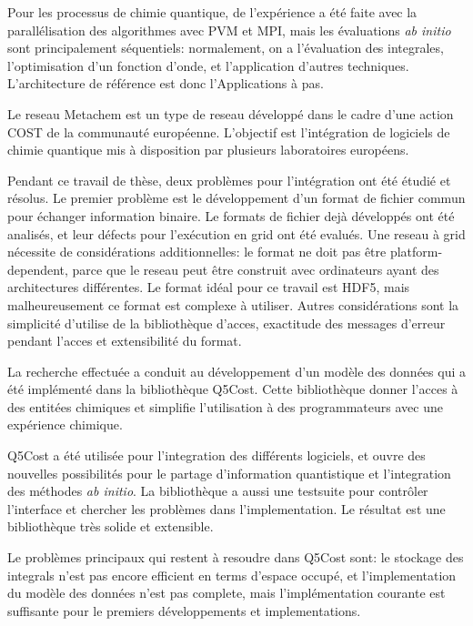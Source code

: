 Pour les processus de chimie quantique, de l'exp\'erience a \'et\'e faite avec la
parall\'elisation des algorithmes avec PVM et MPI, mais les \'evaluations
\textit{ab initio} sont principalement s\'equentiels: normalement, on a l'\'evaluation des
integrales, l'optimisation d'un fonction d'onde, et l'application d'autres
techniques. L'architecture de r\'ef\'erence est donc l'Applications \`a pas.

Le reseau Metachem est un type de reseau d\'evelopp\'e dans le cadre d'une action
COST de la communaut\'e europ\'eenne. L'objectif est l'int\'egration
de logiciels de chimie quantique mis \`a disposition par plusieurs
laboratoires europ\'eens.

Pendant ce travail de th\`ese, deux probl\`emes pour l'int\'egration ont \'et\'e
\'etudi\'e et r\'esolus. 
Le premier probl\`eme est le d\'eveloppement d'un format de fichier commun
pour \'echanger information binaire. 
Le formats de fichier dej\`a d\'evelopp\'es ont \'et\'e analis\'es, et 
leur d\'efects pour l'ex\'ecution en grid ont \'et\'e evalu\'es. Une reseau
\`a grid n\'ecessite de consid\'erations additionnelles: le format ne doit
pas \^etre platform-dependent, parce que le reseau peut \^etre construit
avec ordinateurs ayant des architectures diff\'erentes.  Le format id\'eal
pour ce travail est HDF5, mais malheureusement ce format est complexe \`a
utiliser. Autres consid\'erations sont la simplicit\'e d'utilise de la
biblioth\`eque d'acces, exactitude des messages d'erreur pendant l'acces et
extensibilit\'e du format.

La recherche effectu\'ee a conduit au d\'eveloppement d'un mod\`ele des
donn\'ees qui a \'et\'e impl\'ement\'e dans la biblioth\`eque Q5Cost. Cette
biblioth\`eque donner l'acces \`a des entit\'ees chimiques et simplifie
l'utilisation \`a des programmateurs avec une exp\'erience chimique.

Q5Cost a \'et\'e utilis\'ee pour l'integration des diff\'erents logiciels,
et ouvre des nouvelles possibilit\'es pour le partage d'information
quantistique et l'integration des m\'ethodes \textit{ab initio}.
La biblioth\`eque a aussi une testsuite pour contr\^oler l'interface et
chercher les probl\`emes dans l'implementation. 
Le r\'esultat est une biblioth\`eque tr\`es solide et extensible.

Le probl\`emes principaux qui restent \`a resoudre dans Q5Cost sont: le
stockage des integrals n'est pas encore efficient en terms d'espace
occup\'e, et l'implementation du mod\`ele des donn\'ees n'est pas complete,
mais l'impl\'ementation courante est suffisante pour le premiers
d\'eveloppements et implementations.

